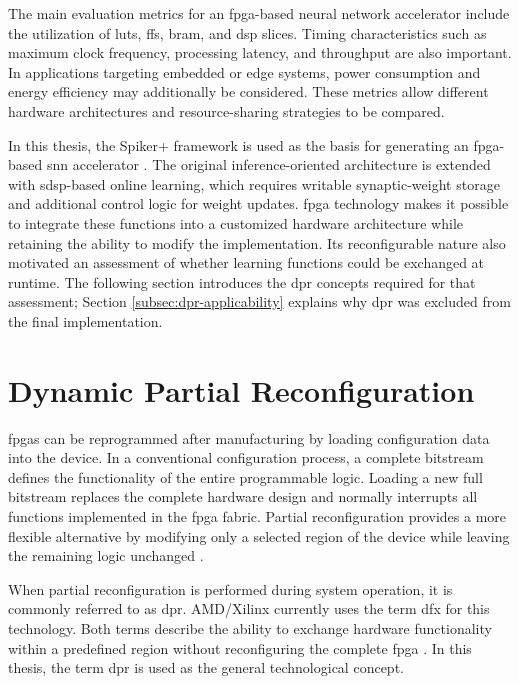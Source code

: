 The main evaluation metrics for an \gls{fpga}-based neural network accelerator include the utilization of \gls{lut}s, \gls{ff}s, \gls{bram}, and \gls{dsp} slices. Timing characteristics such as maximum clock frequency, processing latency, and throughput are also important. In applications targeting embedded or edge systems, power consumption and energy efficiency may additionally be considered. These metrics allow different hardware architectures and resource-sharing strategies to be compared.

In this thesis, the Spiker+ framework is used as the basis for generating an \gls{fpga}-based \gls{snn} accelerator \cite{Carpegna2025}. The original inference-oriented architecture is extended with \gls{sdsp}-based online learning, which requires writable synaptic-weight storage and additional control logic for weight updates. \gls{fpga} technology makes it possible to integrate these functions into a customized hardware architecture while retaining the ability to modify the implementation. Its reconfigurable nature also motivated an assessment of whether learning functions could be exchanged at runtime. The following section introduces the \gls{dpr} concepts required for that assessment; Section \ref{subsec:dpr-applicability} explains why \gls{dpr} was excluded from the final implementation.

\section{Dynamic Partial Reconfiguration}
\label{subsec: dynamic partial reconfiguration}

\gls{fpga}s can be reprogrammed after manufacturing by loading configuration data into the device. In a conventional configuration process, a complete bitstream defines the functionality of the entire programmable logic. Loading a new full bitstream replaces the complete hardware design and normally interrupts all functions implemented in the \gls{fpga} fabric. Partial reconfiguration provides a more flexible alternative by modifying only a selected region of the device while leaving the remaining logic unchanged \cite{VipinFahmy2018}.

When partial reconfiguration is performed during system operation, it is commonly referred to as \gls{dpr}. AMD/Xilinx currently uses the term \gls{dfx} for this technology. Both terms describe the ability to exchange hardware functionality within a predefined region without reconfiguring the complete \gls{fpga} \cite{UG909}. In this thesis, the term \gls{dpr} is used as the general technological concept.

